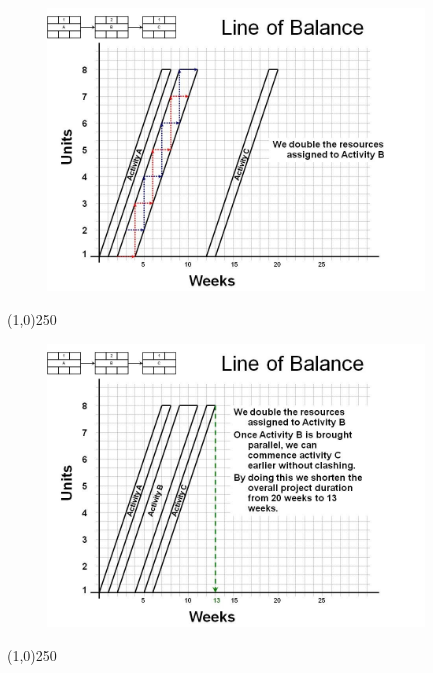 \begin{frame}
\begin{figure}
	\centering
		\includegraphics[width = 10.0cm]{oldnotes/Slide252.jpg}
\end{figure}
\end{frame}
\begin{center}\line(1,0){250}\end{center}






\begin{frame}
\begin{figure}
	\centering
		\includegraphics[width = 10.0cm]{oldnotes/Slide253.jpg}
\end{figure}
\end{frame}
\begin{center}\line(1,0){250}\end{center}






